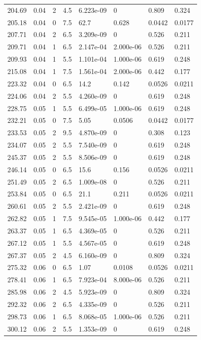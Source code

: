 \documentclass[preview]{standalone}
\begin{document}
{{{\begin{tabular}{L{1.2cm}C{1.2cm} C{0.3cm}C{0.5cm} C{1.4cm}C{1.4cm} C{1.4cm}C{1.4cm}}
  204.69  &  0.04  & 2     & 4.5 &  6.223e-09  & 0  & 0.809 &  0.324   \\ 
  205.18  &  0.04  & 0     & 7.5 &  62.7  & 0.628  & 0.0442 &  0.0177   \\ 
  207.71  &  0.04  & 2     & 6.5 &  3.209e-09  & 0  & 0.526 &  0.211   \\ 
  209.71  &  0.04  & 1     & 6.5 &  2.147e-04  & 2.000e-06  & 0.526 &  0.211   \\ 
  209.93  &  0.04  & 1     & 5.5 &  1.101e-04  & 1.000e-06  & 0.619 &  0.248   \\ 
  215.08  &  0.04  & 1     & 7.5 &  1.561e-04  & 2.000e-06  & 0.442 &  0.177   \\ 
  223.32  &  0.04  & 0     & 6.5 &  14.2  & 0.142  & 0.0526 &  0.0211   \\ 
  224.06  &  0.04  & 2     & 5.5 &  4.260e-09  & 0  & 0.619 &  0.248   \\ 
  228.75  &  0.05  & 1     & 5.5 &  6.499e-05  & 1.000e-06  & 0.619 &  0.248   \\ 
  232.21  &  0.05  & 0     & 7.5 &  5.05  & 0.0506  & 0.0442 &  0.0177   \\ 
  233.53  &  0.05  & 2     & 9.5 &  4.870e-09  & 0  & 0.308 &  0.123   \\ 
  234.07  &  0.05  & 2     & 5.5 &  7.540e-09  & 0  & 0.619 &  0.248   \\ 
  245.37  &  0.05  & 2     & 5.5 &  8.506e-09  & 0  & 0.619 &  0.248   \\ 
  246.14  &  0.05  & 0     & 6.5 &  15.6  & 0.156  & 0.0526 &  0.0211   \\ 
  251.49  &  0.05  & 2     & 6.5 &  1.009e-08  & 0  & 0.526 &  0.211   \\ 
  253.84  &  0.05  & 0     & 6.5 &  21.1  & 0.211  & 0.0526 &  0.0211   \\ 
  260.61  &  0.05  & 2     & 5.5 &  2.421e-09  & 0  & 0.619 &  0.248   \\ 
  262.82  &  0.05  & 1     & 7.5 &  9.545e-05  & 1.000e-06  & 0.442 &  0.177   \\ 
  263.37  &  0.05  & 1     & 6.5 &  4.369e-05  & 0  & 0.526 &  0.211   \\ 
  267.12  &  0.05  & 1     & 5.5 &  4.567e-05  & 0  & 0.619 &  0.248   \\ 
  267.37  &  0.05  & 2     & 4.5 &  6.160e-09  & 0  & 0.809 &  0.324   \\ 
  275.32  &  0.06  & 0     & 6.5 &  1.07  & 0.0108  & 0.0526 &  0.0211   \\ 
  278.41  &  0.06  & 1     & 6.5 &  7.923e-04  & 8.000e-06  & 0.526 &  0.211   \\ 
  285.98  &  0.06  & 2     & 4.5 &  5.923e-09  & 0  & 0.809 &  0.324   \\ 
  292.32  &  0.06  & 2     & 6.5 &  4.335e-09  & 0  & 0.526 &  0.211   \\ 
  298.73  &  0.06  & 1     & 6.5 &  8.068e-05  & 1.000e-06  & 0.526 &  0.211   \\ 
  300.12  &  0.06  & 2     & 5.5 &  1.353e-09  & 0  & 0.619 &  0.248   \\ 
\hline 
\end{tabular} 

}}}
\end{document}
